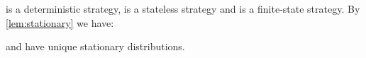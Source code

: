 \FB is a deterministic strategy, \RB is a stateless strategy and \GG is a
finite-state strategy. By \cref{lem:stationary} we have:

\begin{lemma} \label{lem:fb-gg-rb-ergodic}
  \FB and \RB have unique stationary distributions.
\end{lemma}



